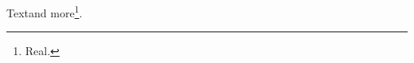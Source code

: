 \documentclass{article}
\begin{document}
Text\footnotemark[\value{nosuch}] and more\footnote{Real.}.\footnotetext[\value{nosuchb}]{Paired.}
\end{document}
